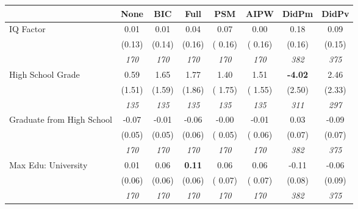 \begin{tabular}{l c c c c c c c}
\toprule
 & None & BIC & Full & PSM & AIPW & DidPm & DidPv \\
\midrule
IQ Factor & 0.01 & 0.01 & 0.04 &      0.07 &      0.00 & 0.18 & 0.09 \\
& (0.13) & (0.14) & (0.16) & (     0.16) & (     0.16) & (0.16) & (0.15) \\
& \textit{ 170 } & \textit{ 170 } & \textit{ 170 } & \textit{ 170 } & \textit{ 170 } & \textit{ 382 } & \textit{ 375 } \\
High School Grade & 0.59 & 1.65 & 1.77 &      1.40 &      1.51 & \textbf{ -4.02 } & 2.46 \\
& (1.51) & (1.59) & (1.86) & (     1.75) & (     1.55) & (2.50) & (2.33) \\
& \textit{ 135 } & \textit{ 135 } & \textit{ 135 } & \textit{ 135 } & \textit{ 135 } & \textit{ 311 } & \textit{ 297 } \\
Graduate from High School & -0.07 & -0.01 & -0.06 &     -0.00 &     -0.01 & 0.03 & -0.09 \\
& (0.05) & (0.05) & (0.06) & (     0.05) & (     0.06) & (0.07) & (0.07) \\
& \textit{ 170 } & \textit{ 170 } & \textit{ 170 } & \textit{ 170 } & \textit{ 170 } & \textit{ 382 } & \textit{ 375 } \\
Max Edu: University & 0.01 & 0.06 & \textbf{ 0.11 } &      0.06 &      0.06 & -0.11 & -0.06 \\
& (0.06) & (0.06) & (0.06) & (     0.07) & (     0.07) & (0.08) & (0.09) \\
& \textit{ 170 } & \textit{ 170 } & \textit{ 170 } & \textit{ 170 } & \textit{ 170 } & \textit{ 382 } & \textit{ 375 } \\
\bottomrule
\end{tabular}
